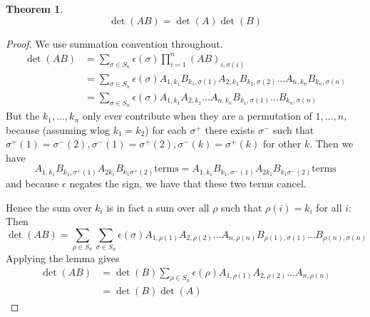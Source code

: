 \documentclass[11pt]{amsart}
\newtheorem{theorem}{Theorem}[section]
\begin{document}
\begin{theorem}$$\det(AB) = \det(A) \det(B)$$
\end{theorem}
\begin{proof}
We use summation convention throughout.
\begin{align*}
\det(AB) &= \sum_{\sigma \in S_n} \epsilon(\sigma) \prod_{i=1}^n (AB)_{i, \sigma(i)}
\\ &= \sum_{\sigma \in S_n} \epsilon(\sigma) A_{1, k_1} B_{k_1, \sigma(1)} A_{2, k_2} B_{k_2, \sigma(2)} \dots A_{n, k_n} B_{k_n, \sigma(n)}
\\ &= \sum_{\sigma \in S_n} \epsilon(\sigma) A_{1, k_1} A_{2, k_2} \dots A_{n, k_n} B_{k_1, \sigma(1)} \dots B_{k_n, \sigma(n)}
\end{align*}
But the $k_1, \dots, k_n$ only ever contribute when they are a permutation of $1, \dots, n$, because (assuming wlog $k_1 = k_2$) for each $\sigma^+$ there exists $\sigma^-$ such that $\sigma^+(1) = \sigma^-(2), \sigma^-(1) = \sigma^+(2), \sigma^-(k) = \sigma^+(k)$ for other $k$. Then we have
$$A_{1, k_1} B_{k_1, \sigma^+(1)} A_{2 k_1} B_{k_1 \sigma^+(2)} \text{terms} = A_{1, k_1} B_{k_1, \sigma^-(1)}  A_{2 k_1} B_{k_1 \sigma^-(2)} \text{terms}$$
and because $\epsilon$ negates the sign, we have that these two terms cancel.

Hence the sum over $k_i$ is in fact a sum over all $\rho$ such that $\rho(i) = k_i$ for all $i$:
Then $$\det(AB) = \sum_{\rho \in S_n} \sum_{\sigma \in S_n} \epsilon(\sigma) A_{1, \rho(1)} A_{2, \rho(2)} \dots A_{n, \rho(n)} B_{\rho(1), \sigma(1)} \dots B_{\rho(n), \sigma(n)}$$
Applying the lemma gives
\begin{align*}
\det(AB) &= \det(B) \sum_{\rho \in S_n} \epsilon(\rho) A_{1, \rho(1)} A_{2, \rho(2)} \dots A_{n, \rho(n)} 
\\&= \det(B) \det(A)
\end{align*}

\end{proof}
\end{document}
